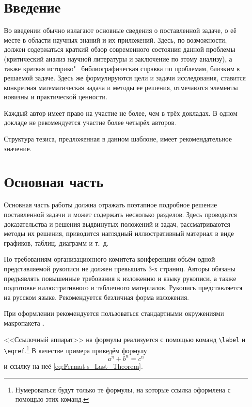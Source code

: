 \documentclass[%
]{ittmm}
\begin{document}
\maketitle

\section{Введение}
\label{sec:intro}

Во введении обычно излагают основные сведения о поставленной задаче, о
её месте в области научных знаний и их приложений.  Здесь, по
возможности, должен содержаться краткий обзор современного состояния
данной проблемы (критический анализ научной литературы и заключение по
этому анализу), а также краткая историко"=библиографическая справка по
проблемам, близким к решаемой задаче.  Здесь же формулируются цели и
задачи исследования, ставится конкретная математическая задача и
методы ее решения, отмечаются элементы новизны и практической
ценности.

Каждый автор имеет право на участие не более, чем в трёх докладах.  В
одном докладе не рекомендуется участие более четырёх авторов.

Структура тезиса, предложенная в данном шаблоне, имеет
рекомендательное значение.

\section{Основная часть}
\label{sec:base-section}

Основная часть работы должна отражать поэтапное подробное решение
поставленной задачи и может содержать несколько разделов. Здесь
проводятся доказательства и решения выдвинутых положений и задач,
рассматриваются методы их решения, приводится наглядный иллюстративный
материал в виде графиков, таблиц, диаграмм и т.~д.

По требованиям организационного комитета конференции объём одной
представляемой рукописи не должен превышать 3-х страниц. Авторы
обязаны предъявлять повышенные требования к изложению и языку
рукописи, а также подготовке иллюстративного и табличного материалов.
Рукопись представляется на русском языке.  Рекомендуется безличная
форма изложения.

При оформлении рекомендуется пользоваться стандартными окружениями
макропакета \LaTeXe.

<<Ссылочный аппарат>> на формулы реализуется с помощью команд
\verb"\label" и \verb"\eqref".\footnote{Нумероваться будут только те
  формулы, на которые ссылка оформлена с помощью этих команд.}  В
качестве примера приведём формулу
\begin{equation}
a^n+b^n=c^n
\label{eq:Fermat's_Last_Theorem}
\end{equation}
и ссылку на неё \eqref{eq:Fermat's_Last_Theorem}.
\end{document}
